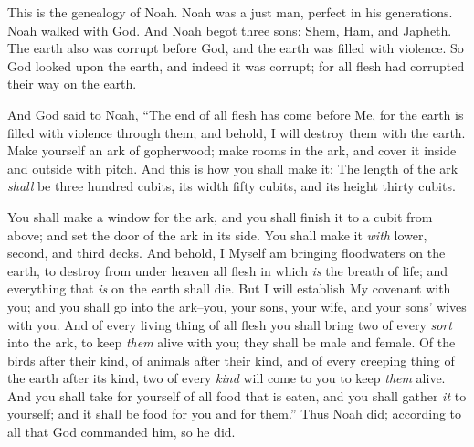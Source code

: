 
\bverse This is the genealogy of Noah. Noah was a just man, perfect in his generations. Noah walked with God.
\bverse And Noah begot three sons: Shem, Ham, and Japheth.
\bverse The earth also was corrupt before God, and the earth was filled with violence.
\bverse So God looked upon the earth, and indeed it was corrupt; for all flesh had corrupted their way on the earth.


\bverse And God said to Noah, ``The end of all flesh has come before Me, for the earth is filled with violence through them; and behold, I will destroy them with the earth.
\bverse Make yourself an ark of gopherwood; make rooms in the ark, and cover it inside and outside with pitch.
\bverse And this is how you shall make it: The length of the ark \textit{shall} be three hundred cubits, its width fifty cubits, and its height thirty cubits.

\bverse You shall make a window for the ark, and you shall finish it to a cubit from above; and set the door of the ark in its side. You shall make it \textit{with} lower, second, and third decks.
\bverse And behold, I Myself am bringing floodwaters on the earth, to destroy from under heaven all flesh in which \textit{is} the breath of life; and everything that \textit{is} on the earth shall die.
\bverse But I will establish My covenant with you; and you shall go into the ark--you, your sons, your wife, and your sons' wives with you.
\bverse And of every living thing of all flesh you shall bring two of every \textit{sort} into the ark, to keep \textit{them} alive with you; they shall be male and female.
\bverse Of the birds after their kind, of animals after their kind, and of every creeping thing of the earth after its kind, two of every \textit{kind} will come to you to keep \textit{them} alive.
\bverse And you shall take for yourself of all food that is eaten, and you shall gather \textit{it} to yourself; and it shall be food for you and for them.''
\bverse Thus Noah did; according to all that God commanded him, so he did.
